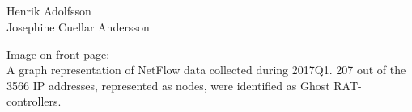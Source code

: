 
\noindent
\thesistitle \\
\thesissubtitle \\
\whatthisis \\
\\
\large{%
    Henrik Adolfsson\\
	Josephine Cuellar Andersson\\
}

\vspace*{\fill}
\noindent
Image on front page:\\
A graph representation of NetFlow data collected during 2017Q1. 207 out of the 3566 IP addresses, represented as nodes, were identified as Ghost RAT-controllers. 
\thispagestyle{empty}
\newpage
